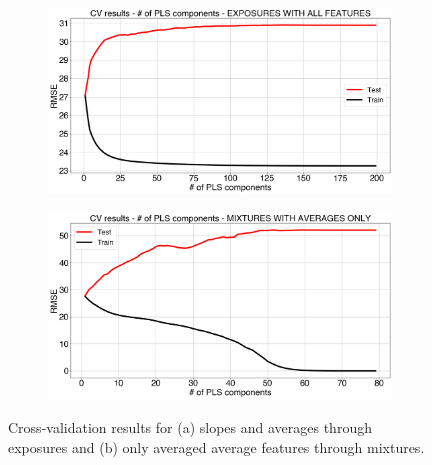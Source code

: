 \begin{figure}[!htb]
	\centering
	
	\begin{subfigure}[t]{0.5\textwidth}
		\includegraphics[width=1\linewidth]{../figures/pls-cv.png}
		\caption{}
		\label{fig:pls-cv} 
	\end{subfigure}
	
	\begin{subfigure}[t]{0.5\textwidth}
		\includegraphics[width=1\linewidth]{../figures/pls-cv-avg-feat.png}
		\caption{}
		\label{fig:pls-cv-avg-feat}
	\end{subfigure}
	
	\caption{Cross-validation results for (a) slopes and averages through exposures and (b) only averaged average features through mixtures.}
	\label{fig:pls-cv-both}
\end{figure}

